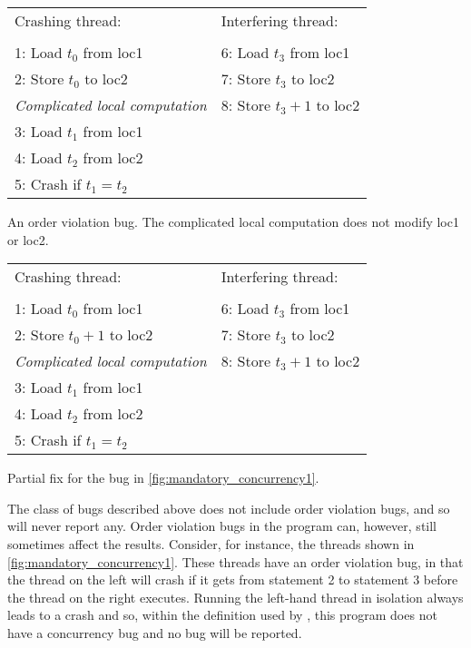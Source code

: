 \begin{sanefig}
{\hfill}
\begin{tabular}{p{8cm}l}
Crashing thread:\hfill         & Interfering thread: \\
\\
1: Load $t_0$ from loc1        & 6: Load $t_3$ from loc1 \\
2: Store $t_0$ to loc2         & 7: Store $t_3$ to loc2 \\
\textit{Complicated local computation} & 8: Store $t_3 + 1$ to loc2 \\
3: Load $t_1$ from loc1        & \\
4: Load $t_2$ from loc2        & \\
5: Crash if $t_1 = t_2$ & \\
\end{tabular}
{\hfill}
\caption{An order violation bug. The complicated local computation
  does not modify loc1 or loc2.}
\label{fig:mandatory_concurrency1}
\end{sanefig}

\begin{sanefig}
\begin{centering}
\hfill
\begin{tabular}{p{8cm}l}
Crashing thread:          & Interfering thread: \\
\\
1: Load $t_0$ from loc1        & 6: Load $t_3$ from loc1 \\
2: Store $t_0+1$ to loc2       & 7: Store $t_3$ to loc2 \\
\textit{Complicated local computation} & 8: Store $t_3 + 1$ to loc2 \\
3: Load $t_1$ from loc1        & \\
4: Load $t_2$ from loc2        & \\
5: Crash if $t_1 = t_2$ & \\
\end{tabular}
\hfill
\end{centering}
\caption{Partial fix for the bug in
  \autoref{fig:mandatory_concurrency1}.}
\label{fig:mandatory_concurrency2}
\end{sanefig}

\noindent
The class of bugs described above does not include order violation
bugs, and so {\technique} will never report any.  Order violation bugs
in the program can, however, still sometimes affect the results.
Consider, for instance, the threads shown in
\autoref{fig:mandatory_concurrency1}.  These threads have an order
violation bug, in that the thread on the left will crash if it gets
from statement 2 to statement 3 before the thread on the right
executes.  Running the left-hand thread in isolation always leads to a
crash and so, within the definition used by {\technique}, this program
does not have a concurrency bug and no bug will be reported.

